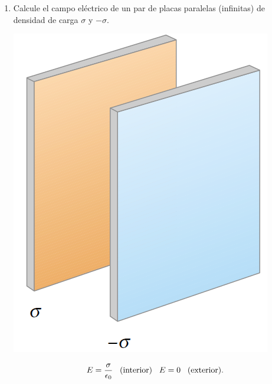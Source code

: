 \documentclass[11pt,twocolumn]{article}
\begin{document}
\begin{enumerate}
\item Calcule el campo eléctrico de un par de placas paralelas (infinitas) de densidad de carga $\sigma$ y $-\sigma$.
{
\begin{center}
\includegraphics[scale=0.2]{placas-paralelas}
\end{center}
}
\begin{displaymath}
E=\dfrac{\sigma}{\epsilon_{0}} \hspace{0.3 cm} (\text{interior}) \hspace{0.3 cm} E=0 \hspace{0.3 cm} (\text{exterior}).
\end{displaymath}

\end{enumerate}
\end{document}
